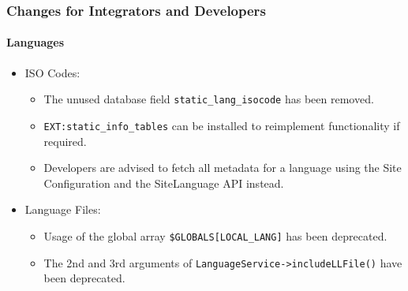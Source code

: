 \begin{frame}[fragile]
	\frametitle{Changes for Integrators and Developers}
	\framesubtitle{Languages}

	\begin{itemize}
		\item ISO Codes:

			\begin{itemize}
				\item The unused database field \texttt{static\_lang\_isocode} has been removed.
				\item \texttt{EXT:static\_info\_tables} can be installed to reimplement functionality if required.
				\item Developers are advised to fetch all metadata for a language using the Site Configuration and the SiteLanguage API instead.
			\end{itemize}

		\item Language Files:

			\begin{itemize}
				\item Usage of the global array \texttt{\$GLOBALS[LOCAL\_LANG]} has been deprecated.
				\item The 2nd and 3rd arguments of \texttt{LanguageService->includeLLFile()} have been deprecated.
			\end{itemize}

	\end{itemize}

\end{frame}


